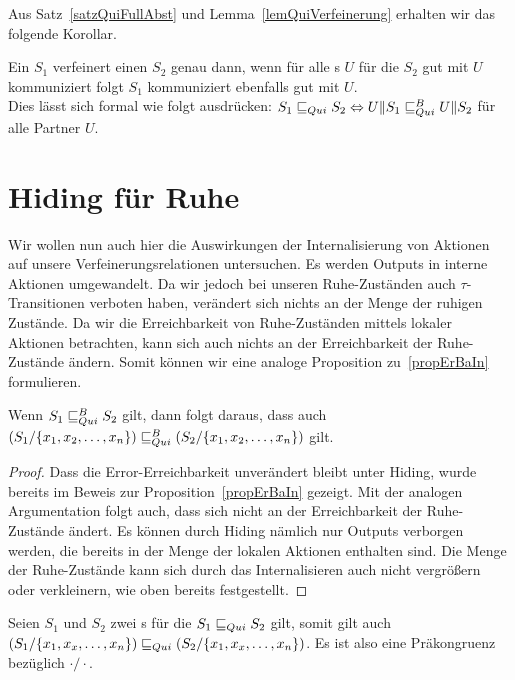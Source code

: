 Aus Satz~\ref{satzQuiFullAbst} und Lemma~\ref{lemQuiVerfeinerung} erhalten wir
das folgende Korollar.

\begin{kor}
  Ein \EIO{} $S_1$ verfeinert einen \EIO{} $S_2$ genau dann, wenn für alle
  \EIO{}s $U$ für die $S_2$ gut mit $U$ kommuniziert folgt $S_1$ kommuniziert
  ebenfalls gut mit $U$.\\
  Dies lässt sich formal wie folgt ausdrücken: $S_1\sqsubseteq _{Qui} S_2\Leftrightarrow
  U\|S_1\sqsubseteq _{Qui}^B U\|S_2$ für alle Partner $U$.
\end{kor}

\section{Hiding für Ruhe}

Wir wollen nun auch hier die Auswirkungen der Internalisierung von Aktionen auf
unsere Verfeinerungsrelationen untersuchen. Es werden Outputs in interne
Aktionen umgewandelt. Da wir jedoch bei unseren Ruhe-Zuständen auch
$\tau$-Transitionen verboten haben, verändert sich nichts an der Menge der ruhigen
Zustände. Da wir die Erreichbarkeit von Ruhe-Zuständen mittels lokaler Aktionen
betrachten, kann sich auch nichts an der Erreichbarkeit der Ruhe-Zustände
ändern. Somit können wir eine analoge Proposition zu~\ref{propErBaIn}
formulieren.

\begin{prop}
  Wenn $S_1\sqsubseteq _{Qui}^B S_2$ gilt, dann folgt daraus, dass auch
  $(S_1/\{x_1,x_2,\dots, x_n\})\sqsubseteq _{Qui}^B (S_2/\{x_1,x_2,\dots, x_n\})$ gilt.
\end{prop}

\begin{proof}
  Dass die Error-Erreichbarkeit unverändert bleibt unter Hiding, wurde bereits
  im Beweis zur Proposition~\ref{propErBaIn} gezeigt. Mit der analogen
  Argumentation folgt auch, dass sich nicht an der Erreichbarkeit der
  Ruhe-Zustände ändert. Es können durch Hiding nämlich nur Outputs verborgen
  werden, die bereits in der Menge der lokalen Aktionen enthalten sind. Die
  Menge der Ruhe-Zustände kann sich durch das Internalisieren auch nicht
  vergrößern oder verkleinern, wie oben bereits festgestellt.
\end{proof}

\begin{satz}
  \label{satzPraeInterQui}
  Seien $S_1$ und $S_2$ zwei \EIO{}s für die $S_1\sqsubseteq _{Qui} S_2$ gilt, somit gilt
  auch $(S_1/\{x_1,x_x,\dots ,x_n\})\sqsubseteq _{Qui} (S_2/\{x_1,x_x,\dots ,x_n\})$. Es
  ist also \QRel{} eine Präkongruenz bezüglich $\cdot /\cdot$.
\end{satz}

